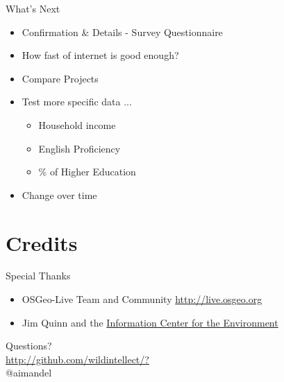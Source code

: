 \documentclass{beamer}
\begin{document}
\begin{frame}{What's Next}
	\begin{itemize}
			\item Confirmation \& Details - Survey Questionnaire
			\item How fast of internet is good enough?
			\item Compare Projects
			\item Test more specific data ...
			\begin{itemize}
				\item Household income
				\item English Proficiency
				\item \% of Higher Education
			\end{itemize}			 
			\item Change over time

	\end{itemize}
\end{frame}


\section{Credits}
\begin{frame}{Special Thanks}
	\begin{itemize}
		\item OSGeo-Live Team and Community \url{http://live.osgeo.org}
		\item Jim Quinn and the \href{http://ice.ucdavis.edu}{Information Center for the Environment}
	\end{itemize}
			\begin{center}
			Questions?\\
			\url{http://github.com/wildintellect/?}\\
			@aimandel
		\end{center}
	

\end{frame}


\end{document}
